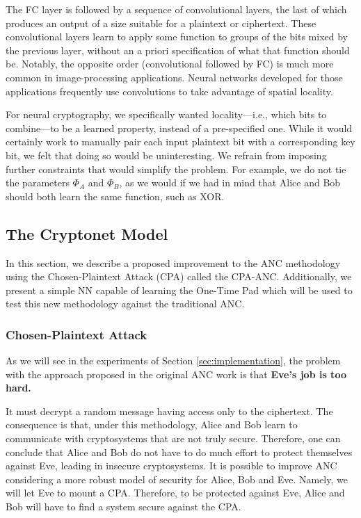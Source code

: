\documentclass[a4paper]{article}
\begin{document}
      The FC layer is followed by a sequence of convolutional
      layers, the last of which produces an output of a size suitable for a plaintext or ciphertext.
      These convolutional layers learn to apply some function to groups of the bits mixed by the previous
      layer, without an a priori specification of what that function should be. Notably, the opposite order
      (convolutional followed by FC) is much more common in image-processing applications. Neural
      networks developed for those applications frequently use convolutions to take advantage of spatial
      locality. 
       
      For neural cryptography, we specifically wanted locality—i.e., which bits to combine—to
      be a learned property, instead of a pre-specified one. While it would certainly work to manually pair
      each input plaintext bit with a corresponding key bit, we felt that doing so would be uninteresting.
      We refrain from imposing further constraints that would simplify the problem. For example, we do
      not tie the parameters $\Phi_{A}$ and $\Phi_{B}$, as we would if we had in mind that Alice and Bob should both
      learn the same function, such as XOR.

    \pagebreak
    \subsection{The Cryptonet Model}
    In this section, we describe a proposed improvement to the ANC methodology using the Chosen-Plaintext
    Attack (CPA) called the CPA-ANC. Additionally, we present a simple NN capable of learning the
    One-Time Pad which will be used to test this new methodology against the traditional ANC.

      \subsubsection{Chosen-Plaintext Attack}
      As we will see in the experiments of Section \ref{sec:implementation}, the problem with the approach 
      proposed in the original ANC work \cite{perfanc} is that {\bfseries Eve's job is too hard.} 
      
      It must decrypt a random message having
      access only to the ciphertext. The consequence is that, under this methodology, Alice and Bob learn to
      communicate with cryptosystems that are not truly secure. Therefore, one can conclude that Alice and
      Bob do not have to do much effort to protect themselves against Eve, leading in insecure cryptosystems.
      It is possible to improve ANC considering a more robust model of security for Alice, Bob and Eve.
      Namely, we will let Eve to mount a CPA. Therefore, to be protected against Eve, Alice and Bob will
      have to find a system secure against the CPA.
\end{document}
